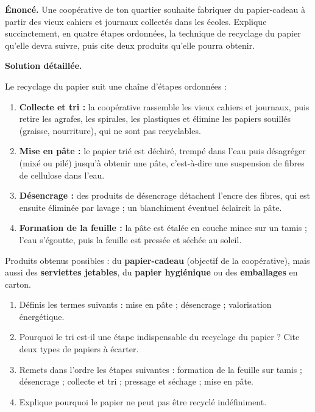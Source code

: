 \documentclass[11pt]{article}
\begin{document}
\begin{exoresolu}
\textbf{Énoncé.} Une coopérative de ton quartier souhaite fabriquer du papier-cadeau à partir des vieux cahiers et journaux collectés dans les écoles. Explique succinctement, en quatre étapes ordonnées, la technique de recyclage du papier qu'elle devra suivre, puis cite deux produits qu'elle pourra obtenir.

\tcblower
\textbf{Solution détaillée.}

Le recyclage du papier suit une chaîne d'étapes ordonnées :
\begin{enumerate}
\item \textbf{Collecte et tri :} la coopérative rassemble les vieux cahiers et journaux, puis retire les agrafes, les spirales, les plastiques et élimine les papiers souillés (graisse, nourriture), qui ne sont pas recyclables.
\item \textbf{Mise en pâte :} le papier trié est déchiré, trempé dans l'eau puis désagréger (mixé ou pilé) jusqu'à obtenir une pâte, c'est-à-dire une suspension de fibres de cellulose dans l'eau.
\item \textbf{Désencrage :} des produits de désencrage détachent l'encre des fibres, qui est ensuite éliminée par lavage ; un blanchiment éventuel éclaircit la pâte.
\item \textbf{Formation de la feuille :} la pâte est étalée en couche mince sur un tamis ; l'eau s'égoutte, puis la feuille est pressée et séchée au soleil.
\end{enumerate}
Produits obtenus possibles : du \textbf{papier-cadeau} (objectif de la coopérative), mais aussi des \textbf{serviettes jetables}, du \textbf{papier hygiénique} ou des \textbf{emballages} en carton.
\end{exoresolu}

\begin{exercice}
\begin{enumerate}
\item Définis les termes suivants : mise en pâte ; désencrage ; valorisation énergétique.
\item Pourquoi le tri est-il une étape indispensable du recyclage du papier ? Cite deux types de papiers à écarter.
\item Remets dans l'ordre les étapes suivantes : formation de la feuille sur tamis ; désencrage ; collecte et tri ; pressage et séchage ; mise en pâte.
\item Explique pourquoi le papier ne peut pas être recyclé indéfiniment.
\end{enumerate}
\end{exercice}
\end{document}
